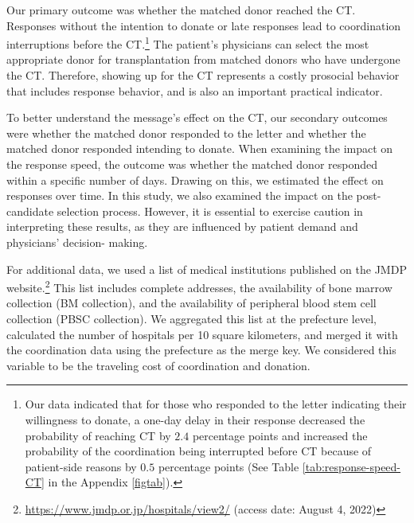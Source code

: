 \documentclass [12pt, a4paper]{article}
\begin{document}
Our primary outcome was whether the matched donor reached the CT. Responses without the intention to donate or late responses lead to coordination interruptions before the CT.\footnote{Our data indicated that for those who responded to the letter indicating their willingness to donate, a one-day delay in their response decreased the probability of reaching CT by \(2.4\) percentage points and increased the probability of the coordination being interrupted before CT because of patient-side reasons by \(0.5\) percentage points (See Table \ref{tab:response-speed-CT} in the Appendix \ref{figtab}).} The patient's physicians can select the most appropriate donor for transplantation from matched donors who have undergone the CT. Therefore, showing up for the CT represents a costly prosocial behavior that includes response behavior, and is also an important practical indicator.

To better understand the message's effect on the CT, our secondary outcomes were whether the matched donor responded to the letter and whether the matched donor responded intending to donate. When examining the impact on the response speed, the outcome was whether the matched donor responded within a specific number of days. Drawing on this, we estimated the effect on responses over time. In this study, we also examined the impact on the post-candidate selection process. However, it is essential to exercise caution in interpreting these results, as they are influenced by patient demand and physicians' decision- making.

For additional data, we used a list of medical institutions published on the JMDP website.\footnote{\url{https://www.jmdp.or.jp/hospitals/view2/} (access date: August 4, 2022)} This list includes complete addresses, the availability of bone marrow collection (BM collection), and the availability of peripheral blood stem cell collection (PBSC collection). We aggregated this list at the prefecture level, calculated the number of hospitals per 10 square kilometers, and merged it with the coordination data using the prefecture as the merge key. We considered this variable to be the traveling cost of coordination and donation.
\end{document}
